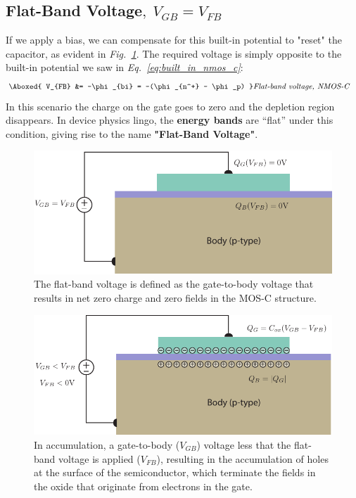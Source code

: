 \subsection{Flat-Band Voltage\texorpdfstring{$,\;V_{GB}=V_{FB}$}{}}
If we apply a bias, we can compensate for this built-in potential to "reset" the capacitor, as evident in \emph{Fig.~\ref{fig:mos_flatband}}.  The required voltage is simply opposite to the built-in potential we saw in \emph{Eq.~\ref{eq:built_in_nmos_c}}:
    \begin{align}
        \Aboxed{ V_{FB} &= -\phi_{bi} = -(\phi_{n^+} - \phi_p) } &\textit{Flat-band voltage, NMOS-C}
    \end{align}
In this scenario the charge on the gate goes to zero and the depletion region disappears.  In device physics lingo, the \textbf{energy bands} are “flat” under this condition, giving rise to the name \textbf{"Flat-Band Voltage"}.
\begin{figure}[H]
\centering
\includegraphics[width=.85\columnwidth]{mos_cap_flatband}
\caption{The flat-band voltage is defined as the gate-to-body voltage that results in net zero charge and zero fields in the MOS-C structure.}
\label{fig:mos_flatband}
\end{figure}
\newpage
\begin{figure}[t]
\centering
\includegraphics[width=.95\columnwidth]{mos_cap_acc}
\caption{In accumulation, a gate-to-body ($V_{GB}$) voltage less that the flat-band voltage is applied ($V_{FB}$), resulting in the accumulation of holes at the surface of the semiconductor, which terminate the fields in the oxide that originate from electrons in the gate.}
\label{fig:mos_accum}
\end{figure}
